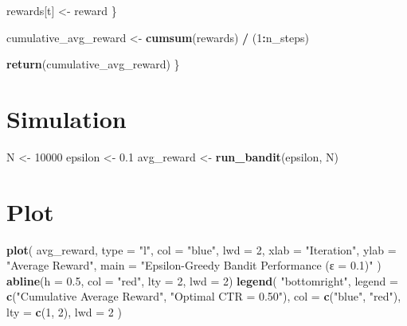 \documentclass[
]{article}
\newenvironment{Shaded}{\begin{snugshade}}{\end{snugshade}}
\newcommand{\AttributeTok}[1]{\textcolor[rgb]{0.13,0.29,0.53}{#1}}
\newcommand{\DecValTok}[1]{\textcolor[rgb]{0.00,0.00,0.81}{#1}}
\newcommand{\FloatTok}[1]{\textcolor[rgb]{0.00,0.00,0.81}{#1}}
\newcommand{\FunctionTok}[1]{\textcolor[rgb]{0.13,0.29,0.53}{\textbf{#1}}}
\newcommand{\NormalTok}[1]{#1}
\newcommand{\OtherTok}[1]{\textcolor[rgb]{0.56,0.35,0.01}{#1}}
\newcommand{\SpecialCharTok}[1]{\textcolor[rgb]{0.81,0.36,0.00}{\textbf{#1}}}
\newcommand{\StringTok}[1]{\textcolor[rgb]{0.31,0.60,0.02}{#1}}
\begin{document}
\begin{Shaded}
\begin{Highlighting}[]
\NormalTok{    rewards[t] }\OtherTok{\textless{}{-}}\NormalTok{ reward}
\NormalTok{  \}}

\NormalTok{  cumulative\_avg\_reward }\OtherTok{\textless{}{-}} \FunctionTok{cumsum}\NormalTok{(rewards) }\SpecialCharTok{/}\NormalTok{ (}\DecValTok{1}\SpecialCharTok{:}\NormalTok{n\_steps)}

  \FunctionTok{return}\NormalTok{(cumulative\_avg\_reward)}
\NormalTok{\}}
\end{Highlighting}
\end{Shaded}

\section{Simulation}\label{simulation}

\begin{Shaded}
\begin{Highlighting}[]
\NormalTok{N }\OtherTok{\textless{}{-}} \DecValTok{10000}
\NormalTok{epsilon }\OtherTok{\textless{}{-}} \FloatTok{0.1}
\NormalTok{avg\_reward }\OtherTok{\textless{}{-}} \FunctionTok{run\_bandit}\NormalTok{(epsilon, N)}
\end{Highlighting}
\end{Shaded}

\section{Plot}\label{plot}

\begin{Shaded}
\begin{Highlighting}[]
\FunctionTok{plot}\NormalTok{(}
\NormalTok{avg\_reward,}
\AttributeTok{type =} \StringTok{"l"}\NormalTok{,}
\AttributeTok{col =} \StringTok{"blue"}\NormalTok{,}
\AttributeTok{lwd =} \DecValTok{2}\NormalTok{,}
\AttributeTok{xlab =} \StringTok{"Iteration"}\NormalTok{,}
\AttributeTok{ylab =} \StringTok{"Average Reward"}\NormalTok{,}
\AttributeTok{main =} \StringTok{"Epsilon{-}Greedy Bandit Performance (ε = 0.1)"}
\NormalTok{)}
\FunctionTok{abline}\NormalTok{(}\AttributeTok{h =} \FloatTok{0.5}\NormalTok{, }\AttributeTok{col =} \StringTok{"red"}\NormalTok{, }\AttributeTok{lty =} \DecValTok{2}\NormalTok{, }\AttributeTok{lwd =} \DecValTok{2}\NormalTok{)}
\FunctionTok{legend}\NormalTok{(}
\StringTok{"bottomright"}\NormalTok{,}
\AttributeTok{legend =} \FunctionTok{c}\NormalTok{(}\StringTok{"Cumulative Average Reward"}\NormalTok{, }\StringTok{"Optimal CTR = 0.50"}\NormalTok{),}
\AttributeTok{col =} \FunctionTok{c}\NormalTok{(}\StringTok{"blue"}\NormalTok{, }\StringTok{"red"}\NormalTok{),}
\AttributeTok{lty =} \FunctionTok{c}\NormalTok{(}\DecValTok{1}\NormalTok{, }\DecValTok{2}\NormalTok{),}
\AttributeTok{lwd =} \DecValTok{2}
\NormalTok{)}
\end{Highlighting}
\end{Shaded}
\end{document}
